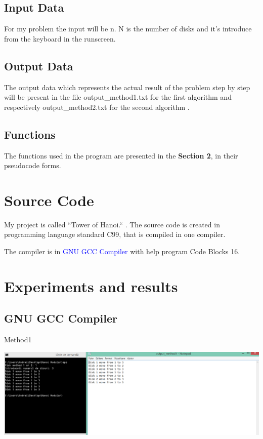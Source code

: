 \documentclass[12]{article}
\begin{document}
\subsection{Input Data}
\textcolor{white}{}

For my problem the input will be n. N is the number of disks and it's introduce from the keyboard in the runscreen. 


\subsection{Output Data}
\textcolor{white}{}

The output data which represents the actual result of the problem step by step will be present in the file output\_method1.txt for the first algorithm and respectively output\_method2.txt for the second algorithm .

\subsection{Functions}
\textcolor{white}{}

The functions used in the program are presented in the \textbf{Section 2}, in their pseudocode forms.

\section{Source Code}

\textcolor{white}{}


My project is called ``Tower of Hanoi.`` . The source code is created in  programming language standard C99, that is compiled in one  compiler.

 The  compiler is in \textcolor{blue}{GNU GCC Compiler} with help program Code Blocks 16. 

\section{Experiments and results}
\textcolor{white}{}
\subsection{GNU GCC Compiler}

Method1

\includegraphics[scale=0.4]{metoda1.png}
\end{document}
